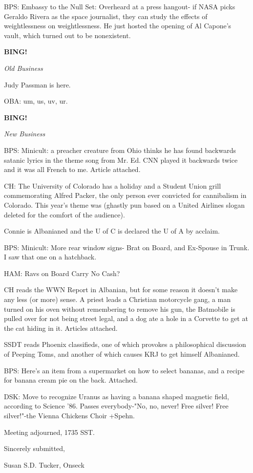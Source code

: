 \documentclass[12pt]{article}
\newcommand{\bing}{{\bf BING!} }
\newcommand{\goto}[1]{\bing \vskip 12pt \centerline{{\em{#1}}}}
\begin{document}
BPS: Embassy to the Null Set: Overheard at a press hangout- if NASA picks Geraldo Rivera as the space journalist, they can study the effects of weightlessness on weightlessness. He just hosted the opening of Al Capone's vault, which turned out to be nonexistent.

\goto{Old Business}

Judy Passman is here.

OBA: um, us, uv, ur.

\goto{New Business}

BPS: Minicult: a preacher creature from Ohio thinks he has found backwards satanic lyrics in the theme song from Mr. Ed. CNN played it backwards twice and it was all French to me. Article attached.

CH: The University of Colorado has a holiday and a Student Union grill commemorating Alfred Packer, the only person ever convicted for cannibalism in Colorado. This year's theme was (ghastly pun based on a United Airlines slogan deleted for the comfort of the audience).

Connie is Albanianed and the U of C is declared the U of A by acclaim.

BPS: Minicult: More rear window signs- Brat on Board, and Ex-Spouse in Trunk. I saw that one on a hatchback.

HAM: Ravs on Board Carry No Cash?

CH reads the WWN Report in Albanian, but for some reason it doesn't make any less (or more) sense. A priest leads a Christian motorcycle gang, a man turned on his oven without remembering to remove his gun, the Batmobile is pulled over for not being street legal, and a dog ate a hole in a Corvette to get at the cat hiding in it. Articles attached.

SSDT reads Phoenix classifieds, one of which provokes a philosophical discussion of Peeping Toms, and another of which causes KRJ to get himself Albanianed.

BPS: Here's an item from a supermarket on how to select bananas, and a recipe for banana cream pie on the back. Attached.

DSK: Move to recognize Uranus as having a banana shaped magnetic field, according to Science '86. Passes everybody-"No, no, never! Free silver! Free silver!"-the Vienna Chickens Choir +Spehn.

\vspace{12pt}

\noindent
Meeting adjourned, 1735 SST.

\vspace{18pt}

\centerline{Sincerely submitted,}
\centerline{Susan S.D. Tucker, Onseck}
\end{document}
